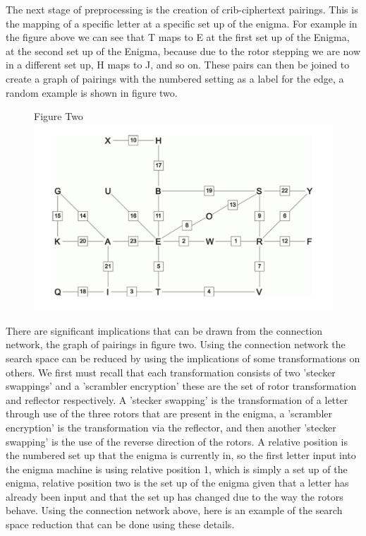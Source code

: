 \documentclass[12pt,a4paper]{article}
\begin{document}
The next stage of preprocessing is the creation of crib-ciphertext pairings. This is the mapping of a specific letter at a specific set up of the enigma. For example in the figure above we can see that T maps to E at the first set up of the Enigma, at the second set up of the Enigma, because due to the rotor stepping we are now in a different set up, H maps to J, and so on. These pairs can then be joined to create a graph of pairings with the numbered setting as a label for the edge, a random example is shown in figure two.

\begin{figure}[h]
\centering
Figure Two
\includegraphics[width=\textwidth]{StageTwoBOMBE.png}
\end{figure}

There are significant implications that can be drawn from the connection network, the graph of pairings in figure two. Using the connection network the search space can be reduced by using the implications of some transformations on others. We first must recall that each transformation consists of two 'stecker swappings' and a 'scrambler encryption' these are the set of rotor transformation and reflector respectively. A 'stecker swapping' is the transformation of a letter through use of the three rotors that are present in the enigma, a 'scrambler encryption' is the transformation via the reflector, and then another 'stecker swapping' is the use of the reverse direction of the rotors. A relative position is the numbered set up that the enigma is currently in, so the first letter input into the enigma machine is using relative position 1, which is simply a set up of the enigma, relative position two is the set up of the enigma given that a letter has already been input and that the set up has changed due to the way the rotors behave. Using the connection network above, here is an example of the search space reduction that can be done using these details.\\
\end{document}
